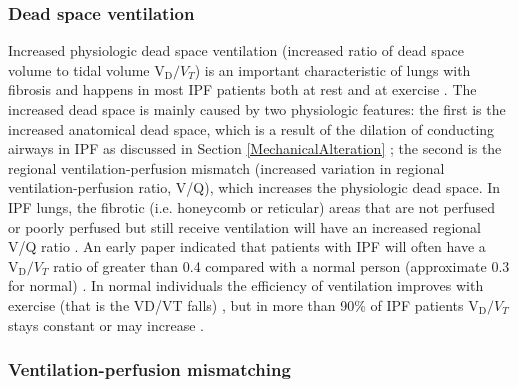 \subsubsection{Dead space ventilation}
Increased physiologic dead space ventilation (increased ratio of dead space volume to tidal volume $\mathrm{V_D}/V_T$) is an important characteristic of lungs with fibrosis and happens in most IPF patients both at rest and at exercise \citep{fulmer1976diffuse, crystal1976idiopathic, agusti1991mechanisms, miki2009acidosis}. The increased dead space is mainly caused by two physiologic features: the first is the increased anatomical dead space, which is a result of the dilation of conducting airways in IPF as discussed in Section \ref{MechanicalAlteration} \citep{plantier2016increased}; the second is the regional ventilation-perfusion mismatch (increased variation in regional ventilation-perfusion ratio, V/Q), which increases the physiologic dead space. In IPF lungs, the fibrotic (i.e. honeycomb or reticular) areas that are  not perfused or poorly perfused but still receive ventilation will have an increased regional V/Q ratio \citep{strickland1993cause, plantier2018physiology}. An early paper indicated that patients with IPF will often have a $\mathrm{V_D}/V_T$ ratio of greater than 0.4 compared with a normal person (approximate 0.3 for normal) \citep{crystal1976idiopathic}. In normal individuals the efficiency of ventilation improves with exercise (that is the VD/VT falls) \citep{ jones1966physiological, wasserman1975exercise}, but in more than 90\% of IPF patients $\mathrm{V_D}/V_T$ stays constant or may increase \citep{crystal1976idiopathic}. 

\subsubsection{Ventilation-perfusion mismatching}

